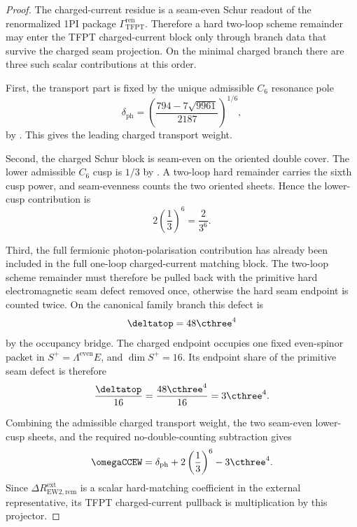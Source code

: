 \begin{proof}
The charged-current residue is a seam-even Schur readout of the renormalized 1PI package
$\Gamma_{\mathrm{TFPT}}^{\mathrm{ren}}$. Therefore a hard two-loop scheme remainder may enter the
TFPT charged-current block only through branch data that survive the charged seam projection. On the
minimal charged branch there are three such scalar contributions at this order.

First, the transport part is fixed by the unique admissible $C_6$ resonance pole
\[
\delta_{\mathrm{ph}}
=
\left(
\frac{794-7\sqrt{9961}}{2187}
\right)^{1/6},
\]
by . This gives the leading charged transport weight.

Second, the charged Schur block is seam-even on the oriented double cover. The lower admissible
$C_6$ cusp is $1/3$ by . A two-loop
hard remainder carries the sixth cusp power, and seam-evenness counts the two oriented sheets.
Hence the lower-cusp contribution is
\[
2\left(\frac13\right)^6=\frac{2}{3^6}.
\]

Third, the full fermionic photon-polarisation contribution has already been included in the full
one-loop charged-current matching block. The two-loop scheme remainder must therefore be pulled
back with the primitive hard electromagnetic seam defect removed once, otherwise the hard seam
endpoint is counted twice. On the canonical family branch this defect is
\[
\deltatop=48\cthree^4
\]
by the occupancy bridge. The charged endpoint occupies one fixed even-spinor packet in
$S^+=\Lambda^{\mathrm{even}}E$, and $\dim S^+=16$. Its endpoint share of the primitive seam defect is
therefore
\[
\frac{\deltatop}{16}=\frac{48\cthree^4}{16}=3\cthree^4.
\]

Combining the admissible charged transport weight, the two seam-even lower-cusp sheets, and the
required no-double-counting subtraction gives
\[
\omegaCCEW
=
\delta_{\mathrm{ph}}
+
2\left(\frac13\right)^6
-
3\cthree^4.
\]
Since $\Delta R_{\mathrm{EW2},\mathrm{rem}}^{\mathrm{ext}}$ is a scalar hard-matching coefficient in
the external representative, its TFPT charged-current pullback is multiplication by this projector.
\end{proof}


